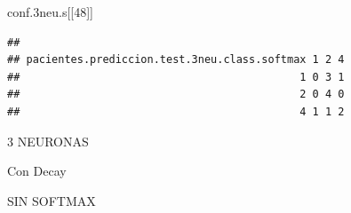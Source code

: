 \documentclass[]{article}
\newenvironment{Shaded}{\begin{snugshade}}{\end{snugshade}}
\newcommand{\DecValTok}[1]{\textcolor[rgb]{0.00,0.00,0.81}{#1}}
\newcommand{\FloatTok}[1]{\textcolor[rgb]{0.00,0.00,0.81}{#1}}
\newcommand{\NormalTok}[1]{#1}
\begin{document}
\begin{Shaded}
\begin{Highlighting}[]
\NormalTok{conf}\FloatTok{.3}\NormalTok{neu.s[[}\DecValTok{48}\NormalTok{]]}
\end{Highlighting}
\end{Shaded}

\begin{verbatim}
##                                             
## pacientes.prediccion.test.3neu.class.softmax 1 2 4
##                                            1 0 3 1
##                                            2 0 4 0
##                                            4 1 1 2
\end{verbatim}

3 NEURONAS

Con Decay

SIN SOFTMAX
\end{document}
